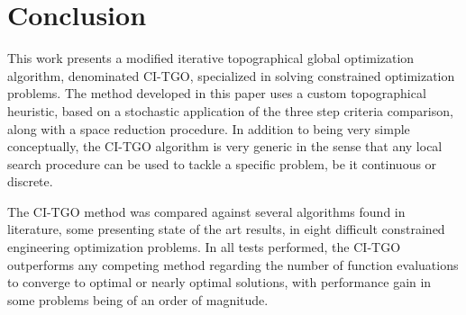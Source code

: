 \section{Conclusion} \label{sec:Conclusion}

This work presents a modified iterative topographical global optimization algorithm, denominated CI-TGO, specialized in solving constrained optimization problems. The method developed in this paper uses a custom topographical heuristic, based on a stochastic application of the three step criteria comparison, along with a space reduction procedure. In addition to being very simple conceptually, the CI-TGO algorithm is very generic in the sense that any local search procedure can be used to tackle a specific problem, be it continuous or discrete.

The CI-TGO method was compared against several algorithms found in literature, some presenting state of the art results, in eight difficult constrained engineering optimization problems. In all tests performed, the CI-TGO outperforms any competing method regarding the number of function evaluations to converge to optimal or nearly optimal solutions, with performance gain in some problems being of an order of magnitude.
